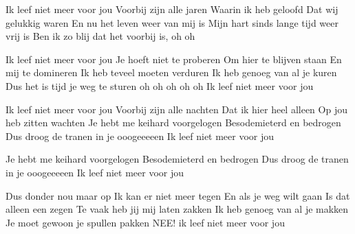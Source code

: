 \begin{verse*}
Ik leef niet meer voor jou
Voorbij zijn alle jaren
Waarin ik heb geloofd
Dat wij gelukkig waren
En nu het leven weer van mij is
Mijn hart sinds lange tijd weer vrij is
Ben ik zo blij dat het voorbij is, oh oh
\end{verse*}

\begin{verse*}
Ik leef niet meer voor jou
Je hoeft niet te proberen
Om hier te blijven staan
En mij te domineren
Ik heb teveel moeten verduren
Ik heb genoeg van al je kuren
Dus het is tijd je weg te sturen
oh oh oh oh oh
Ik leef niet meer voor jou
\end{verse*}

\begin{verse*}
Ik leef niet meer voor jou
Voorbij zijn alle nachten
Dat ik hier heel alleen
Op jou heb zitten wachten
Je hebt me keihard voorgelogen
Besodemieterd en bedrogen
Dus droog de tranen in je ooogeeeeen
Ik leef niet meer voor jou
\end{verse*}

\begin{verse*}
Je hebt me keihard voorgelogen
Besodemieterd en bedrogen
Dus droog de tranen in je ooogeeeeen
Ik leef niet meer voor jou
\end{verse*}

\begin{verse*}
Dus donder nou maar op
Ik kan er niet meer tegen
En als je weg wilt gaan
Is dat alleen een zegen
Te vaak heb jij mij laten zakken
Ik heb genoeg van al je makken
Je moet gewoon je spullen pakken
NEE!
ik leef niet meer voor jou
\end{verse*}